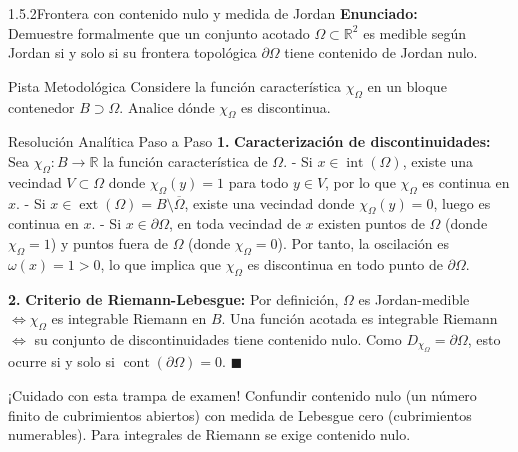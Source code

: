 \documentclass[11pt,a4paper]{article}
\begin{document}
\begin{nivelbox}{1.5.2}{Frontera con contenido nulo y medida de Jordan}
\textbf{Enunciado:}\\
Demuestre formalmente que un conjunto acotado $\Omega \subset \mathbb{R}^2$ es medible según Jordan si y solo si su frontera topológica $\partial\Omega$ tiene contenido de Jordan nulo.

\begin{observacionbox}{Pista Metodológica}
Considere la función característica $\chi_\Omega$ en un bloque contenedor $B \supset \Omega$. Analice dónde $\chi_\Omega$ es discontinua.
\end{observacionbox}

\begin{ejerciciobox}{Resolución Analítica Paso a Paso}
\smallskip\noindent\textbf{1.} \textbf{Caracterización de discontinuidades:}
Sea $\chi_\Omega: B \to \mathbb{R}$ la función característica de $\Omega$.
- Si $x \in \operatorname{int}(\Omega)$, existe una vecindad $V \subset \Omega$ donde $\chi_\Omega(y) = 1$ para todo $y \in V$, por lo que $\chi_\Omega$ es continua en $x$.
- Si $x \in \operatorname{ext}(\Omega) = B \setminus \overline{\Omega}$, existe una vecindad donde $\chi_\Omega(y) = 0$, luego es continua en $x$.
- Si $x \in \partial\Omega$, en toda vecindad de $x$ existen puntos de $\Omega$ (donde $\chi_\Omega = 1$) y puntos fuera de $\Omega$ (donde $\chi_\Omega = 0$). Por tanto, la oscilación es $\omega(x) = 1 > 0$, lo que implica que $\chi_\Omega$ es discontinua en todo punto de $\partial\Omega$.

\smallskip\noindent\textbf{2.} \textbf{Criterio de Riemann-Lebesgue:}
Por definición, $\Omega$ es Jordan-medible $\iff \chi_\Omega$ es integrable Riemann en $B$.
Una función acotada es integrable Riemann $\iff$ su conjunto de discontinuidades tiene contenido nulo.
Como $D_{\chi_\Omega} = \partial\Omega$, esto ocurre si y solo si $\operatorname{cont}(\partial\Omega) = 0$. $\blacksquare$
\end{ejerciciobox}

\begin{errorbox}{¡Cuidado con esta trampa de examen!}
Confundir contenido nulo (un número finito de cubrimientos abiertos) con medida de Lebesgue cero (cubrimientos numerables). Para integrales de Riemann se exige contenido nulo.
\end{errorbox}
\end{nivelbox}
\bigskip
\end{document}
